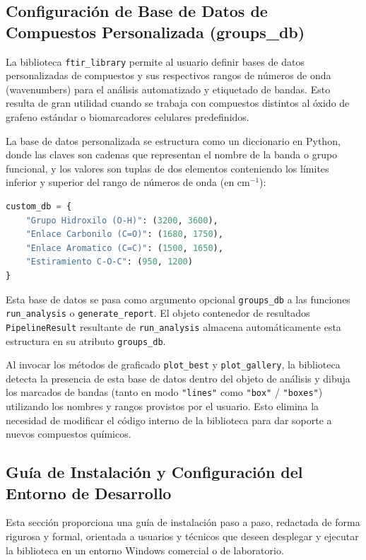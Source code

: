 \subsection{Configuración de Base de Datos de Compuestos Personalizada (groups\_db)}
La biblioteca \texttt{ftir\_library} permite al usuario definir bases de datos personalizadas de compuestos y sus respectivos rangos de números de onda (wavenumbers) para el análisis automatizado y etiquetado de bandas. Esto resulta de gran utilidad cuando se trabaja con compuestos distintos al óxido de grafeno estándar o biomarcadores celulares predefinidos.

La base de datos personalizada se estructura como un diccionario en Python, donde las claves son cadenas que representan el nombre de la banda o grupo funcional, y los valores son tuplas de dos elementos conteniendo los límites inferior y superior del rango de números de onda (en $\text{cm}^{-1}$):

\begin{lstlisting}[language=Python, caption=Definición de base de datos personalizada]
custom_db = {
    "Grupo Hidroxilo (O-H)": (3200, 3600),
    "Enlace Carbonilo (C=O)": (1680, 1750),
    "Enlace Aromatico (C=C)": (1500, 1650),
    "Estiramiento C-O-C": (950, 1200)
}
\end{lstlisting}

Esta base de datos se pasa como argumento opcional \texttt{groups\_db} a las funciones \texttt{run\_analysis} o \texttt{generate\_report}. El objeto contenedor de resultados \texttt{PipelineResult} resultante de \texttt{run\_analysis} almacena automáticamente esta estructura en su atributo \texttt{groups\_db}.

Al invocar los métodos de graficado \texttt{plot\_best} y \texttt{plot\_gallery}, la biblioteca detecta la presencia de esta base de datos dentro del objeto de análisis y dibuja los marcados de bandas (tanto en modo \texttt{"lines"} como \texttt{"box"} / \texttt{"boxes"}) utilizando los nombres y rangos provistos por el usuario. Esto elimina la necesidad de modificar el código interno de la biblioteca para dar soporte a nuevos compuestos químicos.

\clearpage
\subsection{Guía de Instalación y Configuración del Entorno de Desarrollo}
Esta sección proporciona una guía de instalación paso a paso, redactada de forma rigurosa y formal, orientada a usuarios y técnicos que deseen desplegar y ejecutar la biblioteca en un entorno Windows comercial o de laboratorio.

